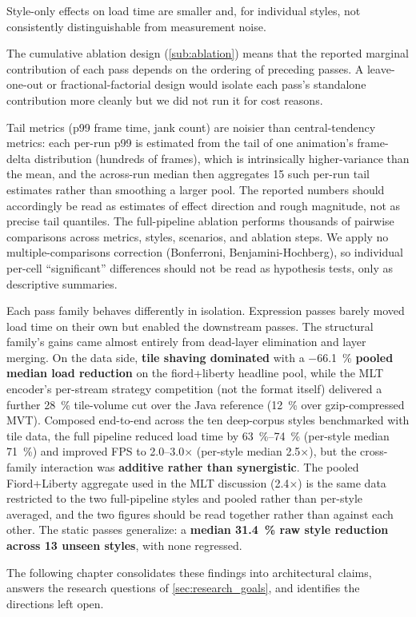 Style-only effects on load time are smaller and, for individual styles, not consistently distinguishable from measurement noise.

The cumulative ablation design (\cref{sub:ablation}) means that the reported marginal contribution of each pass depends on the ordering of preceding passes.
A leave-one-out or fractional-factorial design would isolate each pass's standalone contribution more cleanly but we did not run it for cost reasons.

Tail metrics (p99 frame time, jank count) are noisier than central-tendency metrics: each per-run p99 is estimated from the tail of one animation's frame-delta distribution (hundreds of frames), which is intrinsically higher-variance than the mean, and the across-run median then aggregates 15 such per-run tail estimates rather than smoothing a larger pool. The reported numbers should accordingly be read as estimates of effect direction and rough magnitude, not as precise tail quantiles.
The full-pipeline ablation performs thousands of pairwise comparisons across metrics, styles, scenarios, and ablation steps.
We apply no multiple-comparisons correction (Bonferroni, Benjamini-Hochberg), so individual per-cell \enquote{significant} differences should not be read as hypothesis tests, only as descriptive summaries.

\begin{chaptersummary}
Each pass family behaves differently in isolation.
Expression passes barely moved load time on their own but enabled the downstream passes.
The structural family's gains came almost entirely from dead-layer elimination and layer merging.
On the data side, \textbf{tile shaving dominated} with a \qty{-66.1}{\percent} \textbf{pooled median load reduction} on the fiord+liberty headline pool, while the \ac{MLT} encoder's per-stream strategy competition (not the format itself) delivered a further \qty{28}{\percent} tile-volume cut over the Java reference (\qty{12}{\percent} over gzip-compressed \ac{MVT}).
Composed end-to-end across the ten deep-corpus styles benchmarked with tile data, the full pipeline reduced load time by \qtyrange{63}{74}{\percent} (per-style median \qty{71}{\percent}) and improved \ac{FPS} to \numrange{2.0}{3.0}$\times$ (per-style median \num{2.5}$\times$), but the cross-family interaction was \textbf{additive rather than synergistic}.
The pooled Fiord+Liberty aggregate used in the \ac{MLT} discussion (\num{2.4}$\times$) is the same data restricted to the two full-pipeline styles and pooled rather than per-style averaged, and the two figures should be read together rather than against each other.
The static passes generalize: a \textbf{median \qty{31.4}{\percent} raw style reduction across 13 unseen styles}, with none regressed.

The following chapter consolidates these findings into architectural claims, answers the research questions of \cref{sec:research_goals}, and identifies the directions left open.
\end{chaptersummary}
